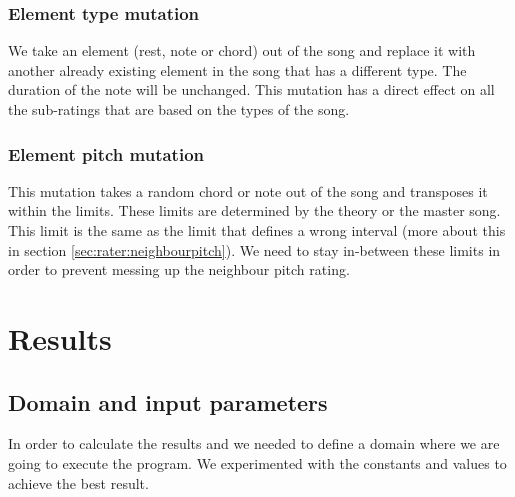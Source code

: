 \documentclass[a4paper]{article}
\begin{document}
\subsubsection{Element type mutation}
We take an element (rest, note or chord) out of the song and replace it with another already existing element in the song that has a different type. The duration of the note will be unchanged. This mutation has a direct effect on all the sub-ratings that are based on the types of the song.

\subsubsection{Element pitch mutation}
This mutation takes a random chord or note out of the song and transposes it within the limits. These limits are determined by the theory or the master song. This limit is the same as the limit that defines a wrong interval (more about this in section \ref{sec:rater:neighbourpitch}). We need to stay in-between these limits in order to prevent messing up the neighbour pitch rating.


\section{Results}
\subsection{Domain and input parameters}
In order to calculate the results and we needed to define a domain where we are going to execute the program. We experimented with the constants and values to achieve the best result. 
\end{document}
